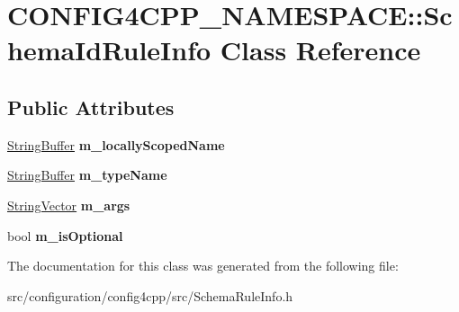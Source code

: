 \hypertarget{classCONFIG4CPP__NAMESPACE_1_1SchemaIdRuleInfo}{\section{C\-O\-N\-F\-I\-G4\-C\-P\-P\-\_\-\-N\-A\-M\-E\-S\-P\-A\-C\-E\-:\-:Schema\-Id\-Rule\-Info Class Reference}
\label{classCONFIG4CPP__NAMESPACE_1_1SchemaIdRuleInfo}
}
\subsection*{Public Attributes}
\begin{DoxyCompactItemize}
\item 
\hypertarget{classCONFIG4CPP__NAMESPACE_1_1SchemaIdRuleInfo_a73fa46e00bc93f79ede56bb0a3968935}{\hyperlink{classCONFIG4CPP__NAMESPACE_1_1StringBuffer}{String\-Buffer} {\bfseries m\-\_\-locally\-Scoped\-Name}}\label{classCONFIG4CPP__NAMESPACE_1_1SchemaIdRuleInfo_a73fa46e00bc93f79ede56bb0a3968935}

\item 
\hypertarget{classCONFIG4CPP__NAMESPACE_1_1SchemaIdRuleInfo_a0e8e02503e60e932adf7e46abf0ba6d1}{\hyperlink{classCONFIG4CPP__NAMESPACE_1_1StringBuffer}{String\-Buffer} {\bfseries m\-\_\-type\-Name}}\label{classCONFIG4CPP__NAMESPACE_1_1SchemaIdRuleInfo_a0e8e02503e60e932adf7e46abf0ba6d1}

\item 
\hypertarget{classCONFIG4CPP__NAMESPACE_1_1SchemaIdRuleInfo_a676a7a4e7b40e02b17ed0356a26fb805}{\hyperlink{classCONFIG4CPP__NAMESPACE_1_1StringVector}{String\-Vector} {\bfseries m\-\_\-args}}\label{classCONFIG4CPP__NAMESPACE_1_1SchemaIdRuleInfo_a676a7a4e7b40e02b17ed0356a26fb805}

\item 
\hypertarget{classCONFIG4CPP__NAMESPACE_1_1SchemaIdRuleInfo_a65b777561403373123190a505f9631b0}{bool {\bfseries m\-\_\-is\-Optional}}\label{classCONFIG4CPP__NAMESPACE_1_1SchemaIdRuleInfo_a65b777561403373123190a505f9631b0}

\end{DoxyCompactItemize}


The documentation for this class was generated from the following file\-:\begin{DoxyCompactItemize}
\item 
src/configuration/config4cpp/src/Schema\-Rule\-Info.\-h\end{DoxyCompactItemize}
